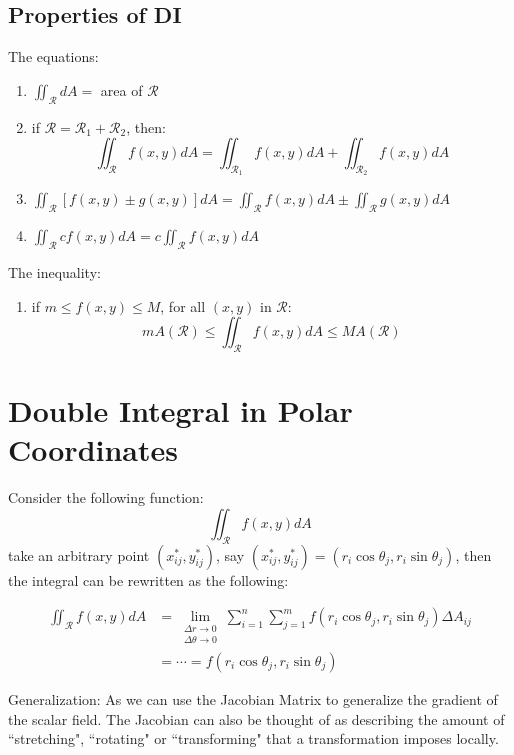 \documentclass[UTF8,a4paper, 10pt, openany]{svmono}
\begin{document}
\subsection{Properties of DI}
The equations:

\begin{enumerate}
\item $\displaystyle\iint_{\mathcal{R}}dA=$ area of $\mathcal{R}$
\item if $\mathcal{R}=\mathcal{R}_1+\mathcal{R}_2$, then:
$$\iint_{\mathcal{R}}f(x,y)dA=\iint_{\mathcal{R}_1}f(x,y)dA+\iint_{\mathcal{R}_2}f(x,y)dA$$
\item $\displaystyle\iint_{\mathcal{R}}[f(x,y)\pm g(x,y)]dA=\displaystyle\iint_{\mathcal{R}}f(x,y)dA\pm \displaystyle\iint_{\mathcal{R}}g(x,y)dA$
\item $\displaystyle\iint_{\mathcal{R}}cf(x,y)dA=c\displaystyle\iint_{\mathcal{R}}f(x,y)dA$
\end{enumerate}

The inequality:

\begin{enumerate}
\item if $m\leq f(x,y) \leq M$, for all $(x,y)$ in $\mathcal{R}$:
$$mA(\mathcal{R})\leq \iint_{\mathcal{R}}f(x,y)dA \leq MA(\mathcal{R})$$
\end{enumerate}

\section{Double Integral in Polar Coordinates}
Consider the following function:
$$\iint_{\mathcal{R}}f(x,y)dA$$
take an arbitrary point $(x_{ij}^*,y_{ij}^*)$, say $(x_{ij}^*,y_{ij}^*)=(r_{i}\cos \theta_{j},r_{i}\sin \theta_{j})$, then the integral can be rewritten as the following:

\begin{align*}
\iint_{\mathcal{R}}f(x,y)dA &= \lim_{\substack{\Delta r\to 0\\ \Delta \theta\to 0}}\displaystyle\sum_{i=1}^{n}\displaystyle\sum_{j=1}^{m}f(r_{i}\cos \theta_{j},r_{i}\sin \theta_{j})\Delta A_{ij}\\
&=\cdots =f(r_{i}\cos \theta_{j},r_{i}\sin \theta_{j})
\end{align*}

Generalization:
As we can use the Jacobian Matrix to generalize the gradient of the scalar field. The Jacobian can also be thought of as describing the amount of ``stretching", ``rotating" or ``transforming" that a transformation imposes locally. \\
\end{document}
